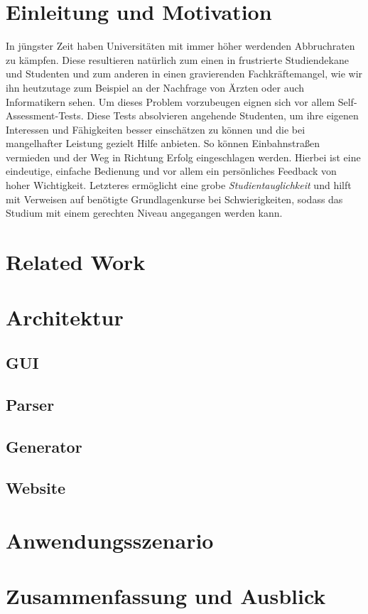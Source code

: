 \documentclass[a4paper,12pt,headsepline,twocolumn]{scrartcl}
\begin{document}
\section{Einleitung und Motivation}
In jüngster Zeit haben Universitäten mit immer höher werdenden Abbruchraten zu kämpfen. Diese resultieren natürlich zum einen in frustrierte Studiendekane und Studenten und zum anderen in einen gravierenden Fachkräftemangel, wie wir ihn heutzutage zum Beispiel an der Nachfrage von Ärzten oder auch Informatikern sehen. Um dieses Problem vorzubeugen eignen sich vor allem Self-Assessment-Tests. Diese Tests absolvieren angehende Studenten, um ihre eigenen Interessen und Fähigkeiten besser einschätzen zu können und die bei mangelhafter Leistung gezielt Hilfe anbieten. So können Einbahnstraßen vermieden und der Weg in Richtung Erfolg eingeschlagen werden. Hierbei ist eine eindeutige, einfache Bedienung und vor allem ein persönliches Feedback von hoher Wichtigkeit. Letzteres ermöglicht eine grobe \textit{Studientauglichkeit} und hilft mit Verweisen auf benötigte Grundlagenkurse bei Schwierigkeiten, sodass das Studium mit einem gerechten Niveau angegangen werden kann.
\section{Related Work}



\section{Architektur}

\subsection{GUI}



\subsection{Parser}



\subsection{Generator}



\subsection{Website}



\section{Anwendungsszenario}

\section{Zusammenfassung und Ausblick}

\onecolumn
\singlespacing
\newpage
{}
\renewcommand\refname{Literaturverzeichnis}


\end{document}
